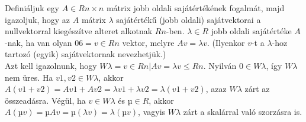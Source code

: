 \begin{frame}
  \begin{tcolorbox}[title={15. (4p)}]
       Deﬁniáljuk egy $A ∈ Rn×n$ mátrix jobb oldali sajátértékének fogalmát, majd igazoljuk, hogy az $A$ mátrix $λ$ sajátértékű (jobb oldali) sajátvektorai a nullvektorral kiegészítve alteret alkotnak $Rn$-ben.
  \tcblower
    $λ ∈ R$ jobb oldali sajátértéke $A$-nak, ha van olyan $0 6= v ∈ Rn$ vektor, melyre $Av = λv$. (Ilyenkor $v$-t a $λ$-hoz tartozó (egyik) sajátvektornak nevezhetjük.)\\
    
    Azt kell igazolnunk, hogy $Wλ = {v ∈ Rn |Av = λv} ≤ Rn$. Nyilván $0 ∈ Wλ$, így $Wλ$ nem üres. Ha $v1,v2 ∈ Wλ$, akkor $A(v1 +v2) = Av1 +Av2 = λv1 +λv2 = λ(v1 +v2)$, azaz $Wλ$ zárt az összeadásra. Végül, ha $v ∈ Wλ$ és $µ ∈ R$, akkor $A(µv) = µAv = µ(λv) = λ(µv)$, vagyis $Wλ$ zárt a skalárral való szorzásra is.
  \end{tcolorbox}
\end{frame}




























	\begin{comment}
	\begin{frame}
		\begin{tcolorbox}[title={Bázistranzformáció}]
			Kérdés: Hány dimenziós?\\

			 \begin{center}
			\begin{tabular}{ c|c c c c }
			 \hline
			  & a & b & c & d \\
			 ${e_1}$ & 3 & 9 & 1 & 5 \\
			 ${e_2}$ & 2 & 10 & 2 & 2 \\
			 ${e_3}$ & -1 & 1 & 1 & -3 \\
			 ${e_4}$ & 0 & -3 & -1 & 1 \\
			 ${e_5}$ & 1 & 2 & 0 & 2 \\
			 \hline
			\end{tabular}
			\end{center}
			\mmedskip

			asd
		\end{tcolorbox}
	\end{frame}
	\end{comment}

